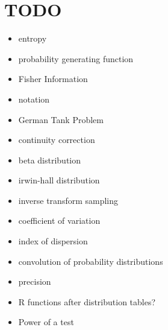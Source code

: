 \documentclass[1pt]{report}
\newcommand{\<}{\langle}
\renewcommand{\>}{\rangle}
\begin{document}
\part{TODO}
\begin{itemize}
\item entropy
\item probability generating function
\item Fisher Information
\item notation
\item German Tank Problem
\item continuity correction
\item beta distribution
\item irwin-hall distribution
\item inverse transform sampling
\item coefficient of variation
\item index of dispersion
\item convolution of probability distributions
\item precision
\item R functions after distribution tables?
\item Power of a test
\end{itemize}
\printindex
%


\end{document}
